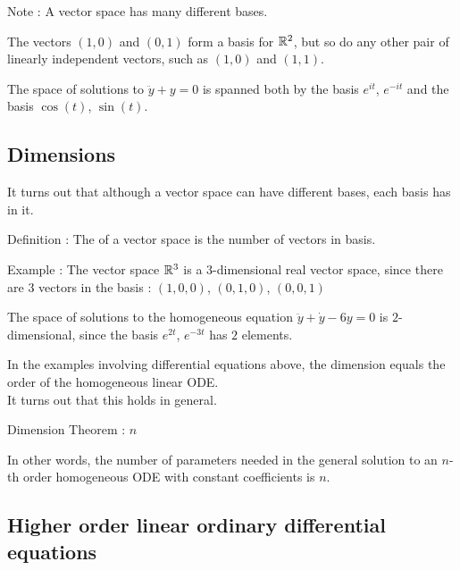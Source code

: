 \documentclass[11pt, openright]{book}
\begin{document}
\begin{dent}{Note :} A vector space has many different bases.

    The vectors $(1,0)$ and $(0,1)$ form a basis for $\mathbb{R}^2$, but so do any other pair of linearly independent vectors, such as $(1,0)$ and $(1,1)$.

    The space of solutions to $\ddot{y}+y=0$ is spanned both by the basis $e^{it}$, $e^{-it}$ and the basis $\cos(t)$, $\sin(t)$.
\end{dent}

\subsection{Dimensions}

It turns out that although a vector space can have different bases, each basis has  in it.
\begin{dent}{Definition :}
    The  of a vector space is the number of vectors in  basis.
\end{dent}

\begin{dent}{Example :}
    The vector space $\mathbb{R}^3$ is a $3$-dimensional real vector space, since there are $3$ vectors in the basis : $(1,0,0)$, $(0,1,0)$, $(0,0,1)$

    The space of solutions to the homogeneous equation $\ddot{y}+\dot{y}-6y=0$ is $2$-dimensional, since the basis $e^{2t}$, $e^{-3t}$ has $2$ elements.
\end{dent}

In the examples involving differential equations above, the dimension equals the order of the homogeneous linear ODE.\\
It turns out that this holds in general.
\begin{dent}{Dimension Theorem :} $n$
\end{dent}

In other words, the number of parameters needed in the general solution to an $n$-th order homogeneous ODE with constant
coefficients is $n$.

\newpage

\subsection{Higher order linear ordinary differential equations}
\end{document}
